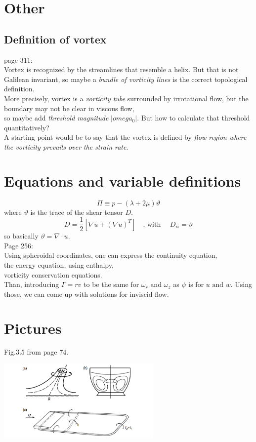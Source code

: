 \documentclass{article}
\begin{document}
\section{Other}
\subsection{Definition of vortex}
page 311:\\
Vortex is recognized by the streamlines that resemble a helix. But that is 
not Galilean invariant, 
so maybe a \emph{bundle of vorticity lines} is the correct topological definition.\\
More precisely, vortex is a \emph{vorticity tube} surrounded by irrotational flow,
but the boundary may not be clear in viscous flow, \\
so maybe add \emph{threshold magnitude} $|omega_0|$. But how to calculate that 
threshold quantitatively?\\
A starting point would be to say that the vortex is defined by
 \emph{flow region where the vorticity prevails over the strain rate}.\cite{wu_vorticity_2006}


\section{Equations and variable definitions}

\begin{equation}
\Pi \equiv p-(\lambda +2\mu)\vartheta
\end{equation}
where $\vartheta$ is the trace of the shear tensor $D$. 
\begin{equation}
    D=\frac{1}{2}[\nabla u+(\nabla u)^T]
     \quad\text{, with } \quad D_{ii}=\vartheta
\end{equation} 
so basically $\vartheta=\nabla\cdot u$. \cite{wu_vorticity_2006}
\\
Page 256:\\
Using spheroidal coordinates, one can express the continuity equation,\\
the energy equation, using enthalpy,\\
vorticity conservation equations.\\
Than, introducing $\Gamma=rv$ to be the same for $\omega_r \text{ and } \omega_z$ as $\psi$ is for $u \text{ and } w$. 
Using those, we can come up with solutions for inviscid flow.
\cite{wu_vorticity_2006}
\section{Pictures}
Fig.3.5 from page 74.

\begin{center}
    \includegraphics[width=8cm]{vorticity_lines.png}
\end{center}


 
 
\end{document}
